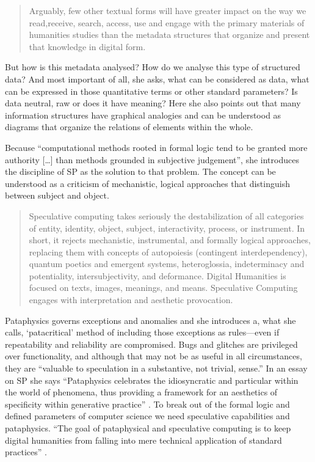 \begin{quotation}
  Arguably, few other textual forms will have greater impact on the way we read,receive, search, access, use and engage with the primary materials of humanities studies than the metadata structures that organize and present that knowledge in digital form. 
\end{quotation}

But how is this metadata analysed? How do we analyse this type of structured data? And most important of all, she asks, what can be considered as data, what can be expressed in those quantitative terms or other standard parameters? Is data neutral, raw or does it have meaning? Here she also points out that many information structures have graphical analogies and can be understood as diagrams that organize the relations of elements within the whole.

Because ``computational methods rooted in formal logic tend to be granted more authority [\ldots] than methods grounded in subjective judgement'', she introduces the discipline of \ac{SP} as the solution to that problem. The concept can be understood as a criticism of mechanistic, logical approaches that distinguish between subject and object.

\begin{quotation}
  Speculative computing takes seriously the destabilization of all categories of entity, identity, object, subject, interactivity, process, or instrument. In short, it rejects mechanistic, instrumental, and formally logical approaches, replacing them with concepts of autopoiesis (contingent interdependency), quantum poetics and emergent systems, heteroglossia, indeterminacy and potentiality, intersubjectivity, and deformance. Digital Humanities is focused on texts, images, meanings, and means. Speculative Computing engages with interpretation and aesthetic provocation. 
\end{quotation}

Pataphysics governs exceptions and anomalies and she introduces a, what she calls, `patacritical' method of including those exceptions as rules---even if repeatability and reliability are compromised. Bugs and glitches are privileged over functionality, and although that may not be as useful in all circumstances, they are ``valuable to speculation in a substantive, not trivial, sense.'' In an essay on \ac{SP} she says ``Pataphysics celebrates the idiosyncratic and particular within the world of phenomena, thus providing a framework for an aesthetics of specificity within generative practice'' \autocite{Drucker2007}. To break out of the formal logic and defined parameters of computer science we need speculative capabilities and pataphysics. ``The goal of pataphysical and speculative computing is to keep digital humanities from falling into mere technical application of standard practices'' \citeyear{Drucker2007}.

